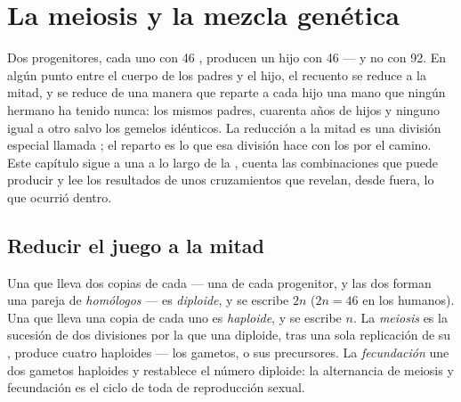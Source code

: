 \chapter{La meiosis y la mezcla genética}\label{ch:g12:meiosis-genetic-shuffling}

Dos progenitores, cada uno con 46 , producen un hijo con 46
--- y no con 92. En algún punto entre el cuerpo de los padres y el
hijo, el recuento se reduce a la mitad, y se reduce de una manera que
reparte a cada hijo una mano que ningún hermano ha tenido nunca: los
mismos padres, cuarenta años de hijos y ninguno igual a otro salvo los
gemelos idénticos. La reducción a la mitad es una división especial
llamada ; el reparto es lo que esa división hace con los
 por el camino. Este capítulo sigue a una  a lo largo
de la , cuenta las combinaciones que puede producir y lee los
resultados de unos cruzamientos que revelan, desde fuera, lo que
ocurrió dentro.

\section{Reducir el juego a la mitad}

\begin{definition}\label{def:g12:meiosis-genetic-shuffling:meiosis}
Una  que lleva dos copias de cada  --- una de cada
progenitor, y las dos forman una pareja de \emph{ homólogos}
--- es \emph{diploide}, y se escribe $2n$ ($2n = 46$ en
los humanos). Una  que lleva una copia de cada uno es
\emph{haploide}, y se escribe $n$. La
\emph{meiosis} es la sucesión de dos divisiones por la
que una  diploide, tras una sola replicación de su , produce
cuatro  haploides --- los gametos, o sus precursores. La
\emph{fecundación} une dos gametos haploides y restablece el número
diploide: la alternancia de meiosis y fecundación es el ciclo de toda
 de reproducción sexual.
\end{definition}

